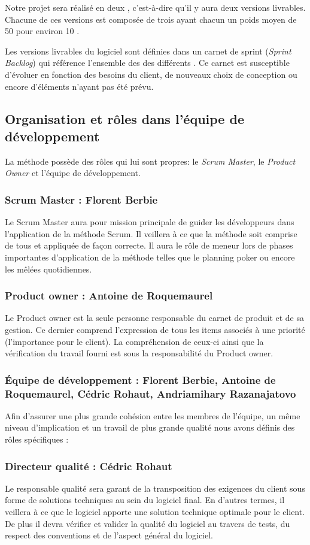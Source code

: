 Notre projet sera réalisé en deux \releases{}, c'est-à-dire qu'il y aura deux versions livrables. Chacune de ces versions est composée de trois 
\sprints{}  ayant chacun un poids moyen de 50 pour environ 10 \stories{}.

Les versions livrables du logiciel sont définies dans un carnet de sprint (\textit{Sprint Backlog}) qui référence l'ensemble des \stories{} des
différents \sprints{}. Ce carnet est susceptible d’évoluer en fonction des besoins du client, de nouveaux choix de conception ou encore d’éléments
n’ayant pas été prévu. 

\subsection{Organisation et rôles dans l'équipe de développement}
La méthode \scrum{} possède des rôles qui lui sont propres: le \textit{Scrum Master}, le \textit{Product Owner} et l'équipe de développement. 

\subsubsection{Scrum Master : Florent Berbie}
Le Scrum Master aura pour mission principale de guider les développeurs dans l'application de la méthode Scrum. Il veillera à ce que la méthode soit
comprise de tous et appliquée de façon correcte. Il aura le rôle de meneur lors de phases importantes d’application de la méthode telles que le
planning poker ou encore les mêlées quotidiennes.
\subsubsection{Product owner : Antoine de Roquemaurel}
Le Product owner est la seule personne responsable du carnet de produit et de sa gestion. Ce dernier comprend l’expression de tous les items associés
à une priorité (l'importance pour le client). La compréhension de ceux-ci ainsi que la vérification du travail fourni est sous la responsabilité du
Product owner.
\subsubsection{Équipe de développement : Florent Berbie, Antoine de Roquemaurel, Cédric Rohaut, Andriamihary Razanajatovo}
Afin d’assurer une plus grande cohésion entre les membres de l’équipe, un même niveau d’implication et un travail de plus grande qualité nous avons
définis des rôles spécifiques : 
\subsubsection{Directeur qualité : Cédric Rohaut}
Le responsable qualité sera garant de la transposition des exigences du client sous forme de solutions techniques au sein du logiciel final. En
d’autres termes, il veillera à ce que le logiciel apporte une solution technique optimale pour le client. De plus il devra vérifier et valider la
qualité du logiciel au travers de tests, du respect des conventions et de l'aspect général du logiciel.

